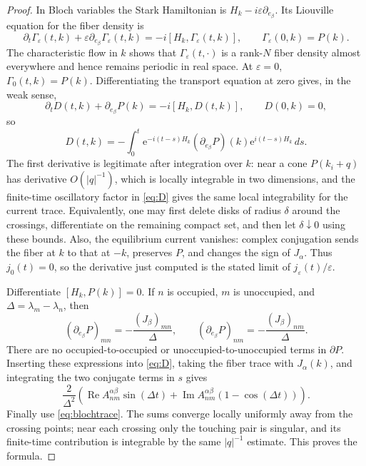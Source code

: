 \documentclass[11pt,a4paper]{article}
\DeclareMathOperator{\RePart}{Re}
\DeclareMathOperator{\ImPart}{Im}
\newcommand{\e}{\mathrm e}
\begin{document}
\begin{proof}
In Bloch variables the Stark Hamiltonian is $H_k-i\varepsilon
\partial_{e_\beta}$. Its Liouville equation for the fiber density is
\[
 \partial_t\Gamma_\varepsilon(t,k)
 +\varepsilon\partial_{e_\beta}\Gamma_\varepsilon(t,k)
 =-i[H_k,\Gamma_\varepsilon(t,k)],\qquad
 \Gamma_\varepsilon(0,k)=P(k).
\]
The characteristic flow in $k$ shows that $\Gamma_\varepsilon(t,\cdot)$ is a
rank-$N$ fiber density almost everywhere and hence remains periodic in real
space. At $\varepsilon=0$, $\Gamma_0(t,k)=P(k)$. Differentiating the transport
equation at zero gives, in the weak sense,
\[
 \partial_t D(t,k)+\partial_{e_\beta}P(k)=-i[H_k,D(t,k)],
 \qquad D(0,k)=0,
\]
so
\begin{equation}\label{eq:D}
 D(t,k)=-\int_0^t \e^{-i(t-s)H_k}
       (\partial_{e_\beta}P)(k)\e^{i(t-s)H_k}\,ds.
\end{equation}
The first derivative is legitimate after integration over $k$: near a cone
$P(k_i+q)$ has derivative $O(|q|^{-1})$, which is locally integrable in two
dimensions, and the finite-time oscillatory factor in \eqref{eq:D} gives the
same local integrability for the current trace. Equivalently, one may first
delete disks of radius $\delta$ around the crossings, differentiate on the
remaining compact set, and then let $\delta\downarrow0$ using these bounds.
Also, the equilibrium current vanishes: complex conjugation sends the fiber
at $k$ to that at $-k$, preserves $P$, and changes the sign of $J_\alpha$.
Thus $j_0(t)=0$, so the derivative just computed is the stated limit of
$j_\varepsilon(t)/\varepsilon$.

Differentiate $[H_k,P(k)]=0$. If $n$ is occupied, $m$ is unoccupied, and
$\Delta=\lambda_m-\lambda_n$, then
\[
 (\partial_{e_\beta}P)_{mn}
 =-\frac{(J_\beta)_{mn}}{\Delta},\qquad
 (\partial_{e_\beta}P)_{nm}
 =-\frac{(J_\beta)_{nm}}{\Delta}.
\]
There are no occupied-to-occupied or unoccupied-to-unoccupied terms in
$\partial P$. Inserting these expressions into \eqref{eq:D}, taking the fiber
trace with $J_\alpha(k)$, and integrating the two conjugate terms in $s$
gives
\[
 \frac{2}{\Delta^2}\left(
 \RePart A_{nm}^{\alpha\beta}\sin(\Delta t)
 +\ImPart A_{nm}^{\alpha\beta}(1-\cos(\Delta t))\right).
\]
Finally use \eqref{eq:blochtrace}. The sums converge locally uniformly away
from the crossing points; near each crossing only the touching pair is
singular, and its finite-time contribution is integrable by the same
$|q|^{-1}$ estimate. This proves the formula.
\end{proof}
\end{document}
